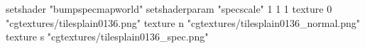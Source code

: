 setshader "bumpspecmapworld"
setshaderparam "specscale" 1 1 1
   texture 0 "cgtextures/tilesplain0136.png"
   texture n "cgtextures/tilesplain0136_normal.png"
   texture s "cgtextures/tilesplain0136_spec.png"